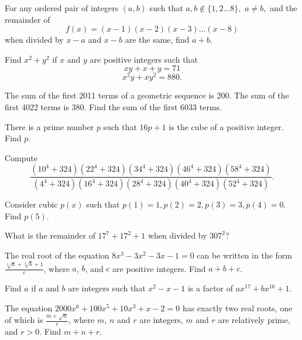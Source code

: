 \documentclass[mast]{lucky}
\begin{document}
\begin{prob}{3}
For any ordered pair of integers $(a,b)$ such that $a,b\not\in \{1,2\dots 8\},$ $a\neq b,$ and the remainder of $$f(x)=(x-1)(x-2)(x-3)\dots(x-8)$$ when divided by $x-a$ and $x-b$ are the same, find $a+b.$
\end{prob}

\begin{prob}[AIME 1991/1]{3}
Find $x^2+y^2$ if $x$ and $y$ are positive integers such that
\[xy+x+y = 71\]
\[x^2y+xy^2 = 880.\]
\end{prob}

\begin{prob}[AIME II 2011/5]{3}
The sum of the first 2011 terms of a geometric sequence is 200. The sum of the first 4022 terms is 380. Find the sum of the first 6033 terms.
\end{prob}

\begin{prob}[AIME I 2015/3]{4}
There is a prime number $p$ such that $16p + 1$ is the cube of a positive integer. Find $p.$
\end{prob}

\begin{prob}[AIME 1987/14]{4}
Compute
\[\frac{(10^4+324)(22^4+324)(34^4+324)(46^4+324)(58^4+324)}{(4^4+324)(16^4+324)(28^4+324)(40^4+324)(52^4+324)}.\]
\end{prob}

\begin{prob}[]{4}
Consider cubic $p(x)$ such that $p(1)=1,p(2)=2,p(3)=3,p(4)=0.$ Find $p(5).$
\end{prob}
    
\begin{req}[JMC 10 2020/22]{6}
What is the remainder of $17^7+17^2+1$ when divided by $307^2?$
\end{req}
    
\begin{prob}[AIME I 2013/5]{9}
The real root of the equation $8x^3 - 3x^2 - 3x - 1 = 0$ can be written in the form $\frac{\sqrt[3]a + \sqrt[3]b + 1}{c}$, where $a$, $b$, and $c$ are positive integers. Find $a+b+c$.
\end{prob}
    
\begin{prob}[AIME 1988/13]{13}
Find $a$ if $a$ and $b$ are integers such that $x^2 - x - 1$ is a factor of $ax^{17} + bx^{16} + 1$.
\end{prob}
    
\begin{prob}[AIME II 2000/13]{13}
The equation $2000x^6+100x^5+10x^3+x-2=0$ has exactly two real roots, one of which is $\frac{m+\sqrt{n}}r$, where $m$, $n$ and $r$ are integers, $m$ and $r$ are relatively prime, and $r>0$. Find $m+n+r$.
\end{prob}
\end{document}
